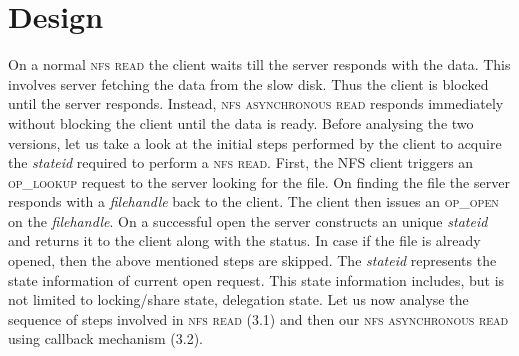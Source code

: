 \section{Design}

\label{Design}

On a normal \textsc{nfs read} the client waits till the server responds with the data. This involves server fetching the data from the slow disk. Thus the client is blocked until the server responds. Instead, \textsc{nfs asynchronous read} responds immediately without blocking the client until the data is ready. Before analysing the two versions, let us take a look at the initial steps performed by the client to acquire the \textit{stateid} required to perform a \textsc{nfs read}. First, the NFS client triggers an \textsc{op\_lookup} request to the server looking for the file. On finding the file the server responds with a \textit{filehandle} back to the client. The client then issues an \textsc{op\_open} on the \textit{filehandle}. On a successful open the server constructs an unique \textit{stateid} and returns it to the client along with the status. In case if the file is already opened,    then the above mentioned steps are skipped. The \textit{stateid} represents the state information of current open request. This state information includes, but is not limited to locking/share state, delegation state. Let us now analyse the sequence of steps involved in \textsc{nfs read} (3.1) and then our \textsc{nfs asynchronous read} using callback mechanism (3.2).

